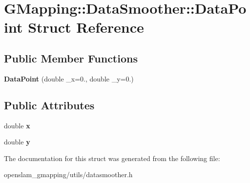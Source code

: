 \hypertarget{structGMapping_1_1DataSmoother_1_1DataPoint}{}\section{G\+Mapping\+:\+:Data\+Smoother\+:\+:Data\+Point Struct Reference}
\label{structGMapping_1_1DataSmoother_1_1DataPoint}
\subsection*{Public Member Functions}
\begin{DoxyCompactItemize}
\item 
\mbox{\label{structGMapping_1_1DataSmoother_1_1DataPoint_acb47dbe11ab408b8b73c6fc58276fd36}} 
{\bfseries Data\+Point} (double \+\_\+x=0., double \+\_\+y=0.)
\end{DoxyCompactItemize}
\subsection*{Public Attributes}
\begin{DoxyCompactItemize}
\item 
\mbox{\label{structGMapping_1_1DataSmoother_1_1DataPoint_af42265481d3ce11143566bd346252245}} 
double {\bfseries x}
\item 
\mbox{\label{structGMapping_1_1DataSmoother_1_1DataPoint_a0ec7d014232c6810e7c51c65cdb05a42}} 
double {\bfseries y}
\end{DoxyCompactItemize}


The documentation for this struct was generated from the following file\+:\begin{DoxyCompactItemize}
\item 
openslam\+\_\+gmapping/utils/datasmoother.\+h\end{DoxyCompactItemize}
